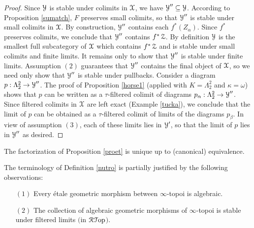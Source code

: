 \begin{proof}
Since $\operatorname{\mathcal{Y}}$ is stable under colimits in $\operatorname{\mathcal{X}}$, we have $\operatorname{\mathcal{Y}}'' \subseteq \operatorname{\mathcal{Y}}$. 
According to Proposition \ref{sumatch}, $F$ preserves small colimits, so that $\operatorname{\mathcal{Y}}''$ is stable under small colimits in $\operatorname{\mathcal{X}}$. By construction, $\operatorname{\mathcal{Y}}''$ contains each $f^{\ast}(Z_{\alpha})$. Since $f^{\ast}$ preserves colimits, we conclude that $\operatorname{\mathcal{Y}}''$ contains $f^{\ast} \operatorname{\mathcal{Z}}$. By definition $\operatorname{\mathcal{Y}}$ is the smallest full subcategory of $\operatorname{\mathcal{X}}$ which contains $f^{\ast} \operatorname{\mathcal{Z}}$ and is stable under small colimits and finite limits. It remains only to show that $\operatorname{\mathcal{Y}}''$ is stable under finite limits. Assumption $(2)$ guarantees that $\operatorname{\mathcal{Y}}''$ contains the final object of $\operatorname{\mathcal{X}}$, so we
need only show that $\operatorname{\mathcal{Y}}''$ is stable under pullbacks. Consider a diagram
$p: \Lambda^2_2 \rightarrow \operatorname{\mathcal{Y}}''$. The proof of Proposition \ref{horse1} (applied
with $K = \Lambda^2_2$ and $\kappa = \omega$) shows that $p$ can be written
as a $\tau$-filtered colimit of diagrams $p_{\alpha}: \Lambda^2_2 \rightarrow \operatorname{\mathcal{Y}}''$. 
Since filtered colimits in $\operatorname{\mathcal{X}}$ are left exact (Example \ref{tucka}), we conclude that the limit of
$p$ can be obtained as a $\tau$-filtered colimit of limits of the diagrams $p_{\beta}$. In view of assumption $(3)$, each of these limits lies in $\operatorname{\mathcal{Y}}'$, so that the limit of $p$ lies in $\operatorname{\mathcal{Y}}''$ as desired.
\end{proof}

\begin{remark}
The factorization of Proposition \ref{proet} is unique up to (canonical) equivalence.
\end{remark}

The terminology of Definition \ref{nutro} is partially justified by the following observations: 

\begin{proposition}\label{charproet}
\begin{itemize}
\item[$(1)$] Every \'{e}tale geometric morphism between $\infty$-topoi is algebraic.
\item[$(2)$] The collection of algebraic geometric morphisms of $\infty$-topoi is stable
under filtered limits $($in $\operatorname{\mathcal{R}{\mathcal T}op}${}$)$.
\end{itemize}
\end{proposition}

